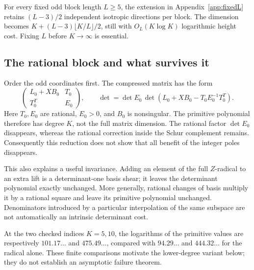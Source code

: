 For every fixed odd block length $L\geq5$, the extension in
Appendix~\ref{app:fixedL} retains $(L-3)/2$ independent isotropic
directions per block. The dimension becomes
$K+(L-3)\lfloor K/L\rfloor/2$, still with $O_L(K\log K)$
logarithmic height cost. Fixing $L$ before $K\to\infty$ is essential.

\subsection{The rational block and what survives it}
Order the odd coordinates first. The compressed matrix has the form
\begin{equation}\label{eq:compression-schur}
 \begin{pmatrix}L_0+XB_0&T_0\\T_0^T&E_0\end{pmatrix},
 \qquad
 \det=\det E_0\,
       \det(L_0+XB_0-T_0E_0^{-1}T_0^T).
\end{equation}
Here $T_0,E_0$ are rational, $E_0>0$, and $B_0$ is nonsingular.
The primitive polynomial therefore has degree $K$, not the full
matrix dimension. The rational factor $\det E_0$ disappears, whereas
the rational correction inside the Schur complement remains.
Consequently this reduction does not show that all benefit of the
integer poles disappears.

This also explains a useful invariance. Adding an element of the
full $Z$-radical to an extra lift is a determinant-one basis shear;
it leaves the determinant polynomial exactly unchanged. More generally,
rational changes of basis multiply it by a rational square and leave
its primitive polynomial unchanged. Denominators introduced by a
particular interpolation of the same subspace are not automatically
an intrinsic determinant cost.

At the two checked indices $K=5,10$, the logarithms of the primitive
values are respectively $101.17\ldots$ and $475.49\ldots$, compared
with $94.29\ldots$ and $444.32\ldots$ for the radical alone. These
finite comparisons motivate the lower-degree variant below; they do
not establish an asymptotic failure theorem.
